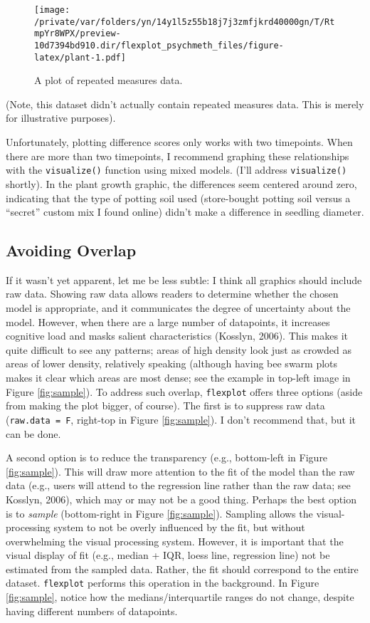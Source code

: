 \documentclass[
  english,
  man]{apa6}
\begin{document}
\begin{figure}
\centering
\texttt{[image: /private/var/folders/yn/14y1l5z55b18j7j3zmfjkrd40000gn/T/RtmpYr8WPX/preview-10d7394bd910.dir/flexplot\_psychmeth\_files/figure-latex/plant-1.pdf]}
\caption{\label{fig:plant}A plot of repeated measures data.\label{fig:plant}}
\end{figure}

\normalsize

\noindent (Note, this dataset didn't actually contain repeated measures data. This is merely for illustrative purposes).

Unfortunately, plotting difference scores only works with two timepoints. When there are more than two timepoints, I recommend graphing these relationships with the \texttt{visualize()} function using mixed models. (I'll address \texttt{visualize()} shortly). In the plant growth graphic, the differences seem centered around zero, indicating that the type of potting soil used (store-bought potting soil versus a ``secret'' custom mix I found online) didn't make a difference in seedling diameter.

\hypertarget{avoiding-overlap}{%
\subsection{Avoiding Overlap}\label{avoiding-overlap}}

If it wasn't yet apparent, let me be less subtle: I think all graphics should include raw data. Showing raw data allows readers to determine whether the chosen model is appropriate, and it communicates the degree of uncertainty about the model. However, when there are a large number of datapoints, it increases cognitive load and masks salient characteristics (Kosslyn, 2006). This makes it quite difficult to see any patterns; areas of high density look just as crowded as areas of lower density, relatively speaking (although having bee swarm plots makes it clear which areas are most dense; see the example in top-left image in Figure \ref{fig:sample}). To address such overlap, \texttt{flexplot} offers three options (aside from making the plot bigger, of course). The first is to suppress raw data (\texttt{raw.data\ =\ F}, right-top in Figure \ref{fig:sample}). I don't recommend that, but it can be done.

A second option is to reduce the transparency (e.g., bottom-left in Figure \ref{fig:sample}). This will draw more attention to the fit of the model than the raw data (e.g., users will attend to the regression line rather than the raw data; see Kosslyn, 2006), which may or may not be a good thing. Perhaps the best option is to \emph{sample} (bottom-right in Figure \ref{fig:sample}). Sampling allows the visual-processing system to not be overly influenced by the fit, but without overwhelming the visual processing system. However, it is important that the visual display of fit (e.g., median + IQR, loess line, regression line) not be estimated from the sampled data. Rather, the fit should correspond to the entire dataset. \texttt{flexplot} performs this operation in the background. In Figure \ref{fig:sample}, notice how the medians/interquartile ranges do not change, despite having different numbers of datapoints.
\end{document}

